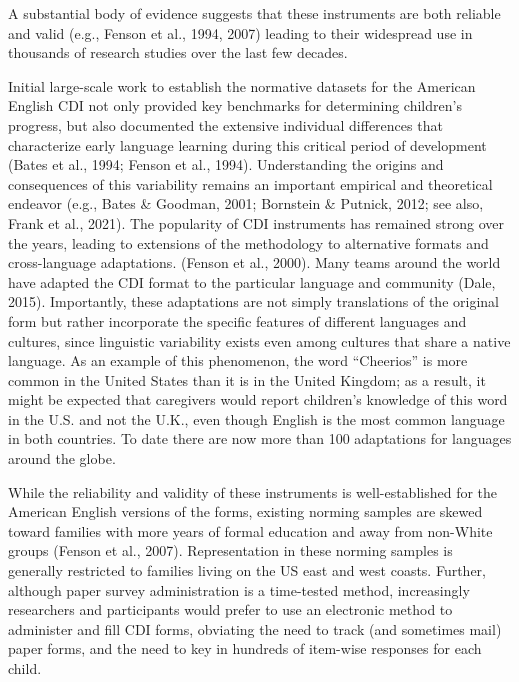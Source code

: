 \documentclass[
  english,
  ,man,floatsintext]{apa6}
\begin{document}
A substantial body of evidence suggests that these instruments are both reliable and valid (e.g., Fenson et al., 1994, 2007) leading to their widespread use in thousands of research studies over the last few decades.

Initial large-scale work to establish the normative datasets for the American English CDI not only provided key benchmarks for determining children's progress, but also documented the extensive individual differences that characterize early language learning during this critical period of development (Bates et al., 1994; Fenson et al., 1994). Understanding the origins and consequences of this variability remains an important empirical and theoretical endeavor (e.g., Bates \& Goodman, 2001; Bornstein \& Putnick, 2012; see also, Frank et al., 2021). The popularity of CDI instruments has remained strong over the years, leading to extensions of the methodology to alternative formats and cross-language adaptations. (Fenson et al., 2000). Many teams around the world have adapted the CDI format to the particular language and community (Dale, 2015). Importantly, these adaptations are not simply translations of the original form but rather incorporate the specific features of different languages and cultures, since linguistic variability exists even among cultures that share a native language. As an example of this phenomenon, the word \enquote{Cheerios} is more common in the United States than it is in the United Kingdom; as a result, it might be expected that caregivers would report children's knowledge of this word in the U.S. and not the U.K., even though English is the most common language in both countries. To date there are now more than 100 adaptations for languages around the globe.

While the reliability and validity of these instruments is well-established for the American English versions of the forms, existing norming samples are skewed toward families with more years of formal education and away from non-White groups (Fenson et al., 2007). Representation in these norming samples is generally restricted to families living on the US east and west coasts. Further, although paper survey administration is a time-tested method, increasingly researchers and participants would prefer to use an electronic method to administer and fill CDI forms, obviating the need to track (and sometimes mail) paper forms, and the need to key in hundreds of item-wise responses for each child.
\end{document}
